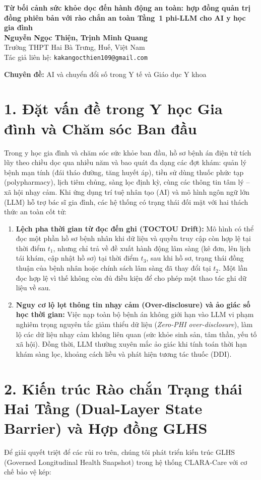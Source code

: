 \documentclass[11pt]{article}
\begin{document}
\begin{center}
{\Large\bfseries Từ bối cảnh sức khỏe dọc đến hành động an toàn: hợp đồng quản trị đồng phiên bản với rào chắn an toàn Tầng~1 phi-LLM cho AI y học gia đình}\\[0.7em]
\textbf{Nguyễn Ngọc Thiện, Trịnh Minh Quang}\\
Trường THPT Hai Bà Trưng, Huế, Việt Nam\\
Tác giả liên hệ: \texttt{kakangocthien109@gmail.com}
\end{center}
\textbf{Chuyên đề:} AI và chuyển đổi số trong Y tế và Giáo dục Y khoa

\section*{1. Đặt vấn đề trong Y học Gia đình và Chăm sóc Ban đầu}
Trong y học gia đình và chăm sóc sức khỏe ban đầu, hồ sơ bệnh án điện tử tích lũy theo chiều dọc qua nhiều năm và bao quát đa dạng các đợt khám: quản lý bệnh mạn tính (đái tháo đường, tăng huyết áp), tiền sử dùng thuốc phức tạp (polypharmacy), lịch tiêm chủng, sàng lọc định kỳ, cùng các thông tin tâm lý -- xã hội nhạy cảm. Khi ứng dụng trí tuệ nhân tạo (AI) và mô hình ngôn ngữ lớn (LLM) hỗ trợ bác sĩ gia đình, các hệ thống có trạng thái đối mặt với hai thách thức an toàn cốt tử:

\begin{enumerate}[leftmargin=1.8em]
\item \textbf{Lệch pha thời gian từ đọc đến ghi (TOCTOU Drift):} Mô hình có thể đọc một phần hồ sơ bệnh nhân khi dữ liệu và quyền truy cập còn hợp lệ tại thời điểm $t_1$, nhưng chỉ trả về đề xuất hành động lâm sàng (kê đơn, lên lịch tái khám, cập nhật hồ sơ) tại thời điểm $t_3$, sau khi hồ sơ, trạng thái đồng thuận của bệnh nhân hoặc chính sách lâm sàng đã thay đổi tại $t_2$. Một lần đọc hợp lệ vì thế không còn đủ điều kiện để cho phép một thao tác ghi dữ liệu về sau.
\item \textbf{Nguy cơ lộ lọt thông tin nhạy cảm (Over-disclosure) và ảo giác số học thời gian:} Việc nạp toàn bộ bệnh án không giới hạn vào LLM vi phạm nghiêm trọng nguyên tắc giảm thiểu dữ liệu (\emph{Zero-PHI over-disclosure}), làm lộ các dữ liệu nhạy cảm không liên quan (sức khỏe sinh sản, tâm thần, yếu tố xã hội). Đồng thời, LLM thường xuyên mắc ảo giác khi tính toán thời hạn khám sàng lọc, khoảng cách liều và phát hiện tương tác thuốc (DDI).
\end{enumerate}

\section*{2. Kiến trúc Rào chắn Trạng thái Hai Tầng (Dual-Layer State Barrier) và Hợp đồng GLHS}
Để giải quyết triệt để các rủi ro trên, chúng tôi phát triển kiến trúc GLHS (Governed Longitudinal Health Snapshot) trong hệ thống CLARA-Care với cơ chế bảo vệ kép:
\end{document}
